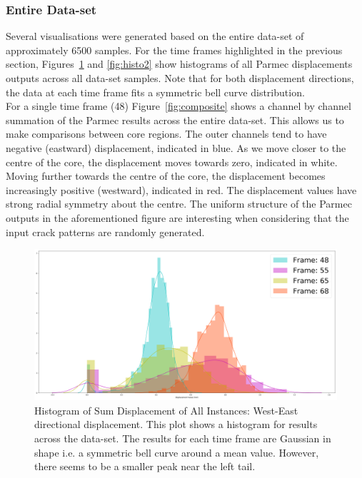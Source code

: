 \subsubsection{Entire Data-set}


Several visualisations were generated based on the entire data-set of approximately 6500 samples. For the time frames highlighted in the previous section, Figures~\ref{fig:histo1} and \ref{fig:histo2} show histograms of all Parmec displacements outputs across all data-set samples. Note that for both displacement directions, the data at each time frame fits a symmetric bell curve distribution. 
\\

\noindent
For a single time frame (48) Figure~\ref{fig:composite} shows a channel by channel summation of the Parmec results across the entire data-set. This allows us to make comparisons between core regions. The outer channels tend to have negative (eastward) displacement, indicated in blue. As we move closer to the centre of the core, the displacement moves towards zero, indicated in white. Moving further towards the centre of the core, the displacement becomes increasingly positive (westward), indicated in red. The displacement values have strong radial symmetry about the centre. The uniform structure of the Parmec outputs in the aforementioned figure are interesting when considering that the input crack patterns are randomly generated.  
\\


\begin{figure}[p]
	\centering
	\includegraphics[scale=0.15]{Figures/histo1.png}
	\caption{Histogram of Sum Displacement of All Instances: West-East directional displacement. This plot shows a histogram for results across the data-set. The results for each time frame are Gaussian in shape i.e. a symmetric bell curve around a mean value. However, there seems to be a smaller peak near the left tail.}
	\label{fig:histo1}
\end{figure}

